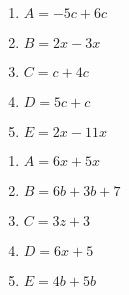 \documentclass[11pt]{article}
\begin{document}
\begin{multicols}{2}
\begin{exercice}[1][Distribuer]
\begin{enumerate}[itemsep=1em]
\item $A=-5c+6c$
\item $B=2x-3x$
\item $C=c+4c$
\item $D=5c+c$
\item $E=2x-11x$
\end{enumerate}
\end{exercice}

\begin{exercice}[1]
\begin{enumerate}[itemsep=1em]
\item $A=6x+5x$
\item $B=6b+3b+7$
\item $C=3z+3$
\item $D=6x+5$
\item $E=4b+5b$
\end{enumerate}
\end{exercice}
\end{multicols}
\end{document}
